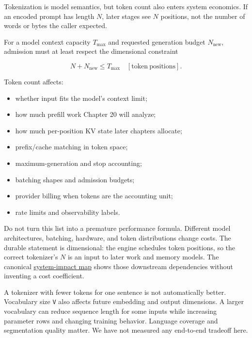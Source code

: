 Tokenization is model semantics, but token count also enters system
economics. If an encoded prompt has length \(N\), later stages see \(N\)
positions, not the number of words or bytes the caller expected.

For a model context capacity \(T_{\max}\) and requested generation
budget \(N_{\mathrm{new}}\), admission must at least respect the
dimensional constraint

\begin{equation}
N+N_{\mathrm{new}}\le T_{\max}\quad[\mathrm{token\ positions}].
\end{equation}

Token count affects:

\begin{itemize}
\tightlist
\item
  whether input fits the model's context limit;
\item
  how much prefill work Chapter 20 will analyze;
\item
  how much per-position KV state later chapters allocate;
\item
  prefix/cache matching in token space;
\item
  maximum-generation and stop accounting;
\item
  batching shapes and admission budgets;
\item
  provider billing when tokens are the accounting unit;
\item
  rate limits and observability labels.
\end{itemize}

Do not turn this list into a premature performance formula. Different
model architectures, batching, hardware, and token distributions change
costs. The durable statement is dimensional: the engine schedules token
positions, so the correct tokenizer's \(N\) is an input to later work
and memory models. The canonical
\href{https://github.com/hermonai/inside-the-llm-engine/blob/astra-visual-rewrite/diagrams/tokenizer/token-count-system-impact.txt}{system-impact
map} shows those downstream dependencies without inventing a cost
coefficient.

A tokenizer with fewer tokens for one sentence is not automatically
better. Vocabulary size \texttt{V} also affects future embedding and
output dimensions. A larger vocabulary can reduce sequence length for
some inputs while increasing parameter rows and changing training
behavior. Language coverage and segmentation quality matter. We have not
measured any end-to-end tradeoff here.


